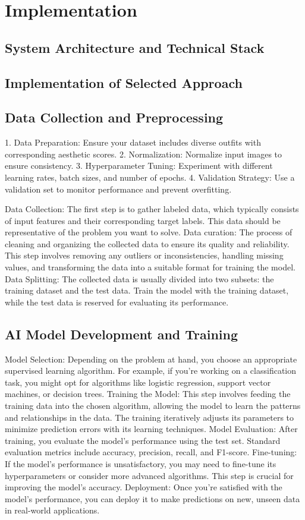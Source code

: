 \chapter{Implementation}
\section{System Architecture and Technical Stack}
\section{Implementation of Selected Approach}
\section{Data Collection and Preprocessing}


1. Data Preparation: Ensure your dataset includes diverse outfits with corresponding aesthetic scores.
2. Normalization: Normalize input images to ensure consistency.
3. Hyperparameter Tuning: Experiment with different learning rates, batch sizes, and number of epochs.
4. Validation Strategy: Use a validation set to monitor performance and prevent overfitting.

Data Collection: The first step is to gather labeled data, which typically consists of input features and their corresponding target labels. This data should be representative of the problem you want to solve.
Data curation: The process of cleaning and organizing the collected data to ensure its quality and reliability. This step involves removing any outliers or inconsistencies, handling missing values, and transforming the data into a suitable format for training the model.
Data Splitting: The collected data is usually divided into two subsets: the training dataset and the test data. Train the model with the training dataset, while the test data is reserved for evaluating its performance.

\section{AI Model Development and Training}

Model Selection: Depending on the problem at hand, you choose an appropriate supervised learning algorithm. For example, if you're working on a classification task, you might opt for algorithms like logistic regression, support vector machines, or decision trees.
Training the Model: This step involves feeding the training data into the chosen algorithm, allowing the model to learn the patterns and relationships in the data. The training iteratively adjusts its parameters to minimize prediction errors with its learning techniques.
Model Evaluation: After training, you evaluate the model's performance using the test set. Standard evaluation metrics include accuracy, precision, recall, and F1-score.
Fine-tuning: If the model's performance is unsatisfactory, you may need to fine-tune its hyperparameters or consider more advanced algorithms. This step is crucial for improving the model's accuracy.
Deployment: Once you're satisfied with the model's performance, you can deploy it to make predictions on new, unseen data in real-world applications.

